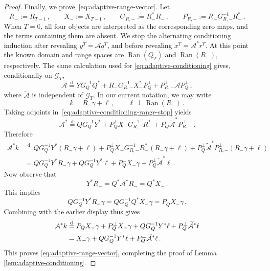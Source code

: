 \documentclass[10pt,a4paper]{amsart}
\newcommand{\cA}{\mathcal A}
\begin{document}
\begin{proof}
Finally, we prove~\eqref{eq:adaptive-range-vector}. Let
\[
 R_-:=R_{T-1}\,,\qquad X_-:=X_{T-1}\,,
 \qquad G_{R,-}:=R_-^*R_-\,,
 \qquad P_{R,-}:=R_-G_{R,-}^{-1}R_-^*\,.
\]
When $T=0$, all four objects are interpreted as the corresponding zero maps, and the terms containing them are absent. We stop the alternating conditioning induction after revealing $y^T=\cA q^T$, and before revealing $x^T=\cA^*r^T$.  At this point the known domain and range spaces are $\operatorname{Ran}(Q_T)$ and $\operatorname{Ran}(R_-)$, respectively. The same calculation used for \eqref{eq:adaptive-conditioning} gives, conditionally on $\mathscr G_T$,
\begin{equation}\label{eq:adaptive-conditioning-range-stop}
 \cA
 \stackrel{\mathrm d}{=}
 YG_Q^{-1}Q^*
 +R_-G_{R,-}^{-1}X_-^*P_Q^\perp
 +P_{R,-}^\perp\widetilde{\cA}P_Q^\perp\,,
\end{equation}
where $\widetilde{\cA}$ is independent of $\mathscr G_T$.  In our current notation, we may write
\[
  k=R_-\gamma+\ell\,, \qquad \ell\perp\operatorname{Ran}(R_-)\,.
\]
Taking adjoints in~\eqref{eq:adaptive-conditioning-range-stop} yields
\[
  \mathcal A^*
  \stackrel{\mathrm d}{=}
  QG_Q^{-1}Y^*
  +P_Q^\perp X_-G_{R,-}^{-1}R_-^*
  +P_Q^\perp\widetilde{\mathcal A}^*P_{R,-}^\perp\,.
\]
Therefore
\[
\begin{aligned}
  \mathcal A^*k
  &\stackrel{\mathrm d}{=}
  QG_Q^{-1}Y^*(R_-\gamma+\ell)
  +
  P_Q^\perp X_-G_{R,-}^{-1}R_-^*(R_-\gamma+\ell)
  +
  P_Q^\perp\widetilde{\mathcal A}^*P_{R,-}^\perp(R_-\gamma+\ell)  \\
  &=
  QG_Q^{-1}Y^*R_-\gamma
  +
  QG_Q^{-1}Y^*\ell
  +
  P_Q^\perp X_-\gamma
  +
  P_Q^\perp\widetilde{\mathcal A}^*\ell\,.
\end{aligned}
\]
Now observe that
\[
  Y^*R_-=Q^*\mathcal A^*R_-=Q^*X_-\,.
\]
This implies
\[
  QG_Q^{-1}Y^*R_-\gamma
  =
  QG_Q^{-1}Q^*X_-\gamma
  =
  P_QX_-\gamma\,.
\]
Combining with the earlier display thus gives
\begin{align}
\mathcal A^*k
  &\stackrel{\mathrm d}{=}
  P_QX_-\gamma
  +
  P_Q^\perp X_-\gamma
  +
  QG_Q^{-1}Y^*\ell
  +
  P_Q^\perp\widetilde{\mathcal A}^*\ell \notag \\
  &= X_-\gamma
  +
  QG_Q^{-1}Y^*\ell
  +
  P_Q^\perp\widetilde{\mathcal A}^*\ell\,. \notag
\end{align}
This proves \eqref{eq:adaptive-range-vector}, completing the proof of Lemma \ref{lem:adaptive-conditioning}.
\end{proof}
\end{document}
